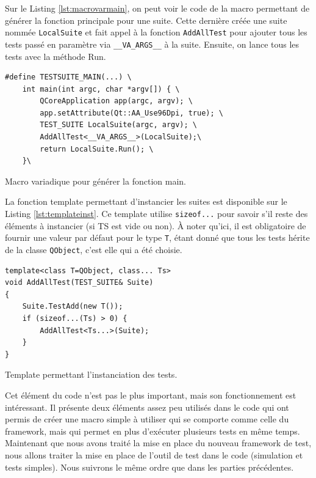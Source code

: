\documentclass[a4paper]{article}
\begin{document}
Sur le Listing \ref{lst:macrovarmain}, on peut voir le code de la macro
permettant de générer la fonction principale pour une suite. Cette dernière
créée une suite nommée \verb|LocalSuite| et fait appel à la fonction
\verb|AddAllTest| pour ajouter tous les tests passé en paramètre via
\verb|__VA_ARGS__| à la suite. Ensuite, on lance tous les tests avec la méthode
Run.

\pagebreak
\begin{listing}[ht!]
\begin{verbatim}
#define TESTSUITE_MAIN(...) \
    int main(int argc, char *argv[]) { \
        QCoreApplication app(argc, argv); \
        app.setAttribute(Qt::AA_Use96Dpi, true); \
        TEST_SUITE LocalSuite(argc, argv); \
        AddAllTest<__VA_ARGS__>(LocalSuite);\
        return LocalSuite.Run(); \
    }\
\end{verbatim}
\caption{Macro variadique pour générer la fonction main.}
\label{lst:macrovarmain}
\end{listing}

La fonction template permettant d'instancier les suites est disponible sur le
Listing \ref{lst:templateinst}. Ce template utilise \verb|sizeof...| pour savoir
s'il reste des éléments à instancier (si TS est vide ou non). À noter qu'ici, il
est obligatoire de fournir une valeur par défaut pour le type \verb|T|, étant
donné que tous les tests hérite de la classe \verb|QObject|, c'est elle qui a
été choisie.

\begin{listing}[ht!]
\begin{verbatim}
template<class T=QObject, class... Ts>
void AddAllTest(TEST_SUITE& Suite)
{
    Suite.TestAdd(new T());
    if (sizeof...(Ts) > 0) {
        AddAllTest<Ts...>(Suite);
    }
}
\end{verbatim}
\caption{Template permettant l'instanciation des tests.}
\label{lst:templateinst}
\end{listing}

Cet élément du code n'est pas le plus important, mais son fonctionnement est
intéressant. Il présente deux éléments assez peu utilisés dans le code qui ont
permis de créer une macro simple à utiliser qui se comporte comme celle du
framework, mais qui permet en plus d'exécuter plusieurs tests en même temps. \\

Maintenant que nous avons traité la mise en place du nouveau framework de test,
nous allons traiter la mise en place de l'outil de test dans le code (simulation
et tests simples). Nous suivrons le même ordre que dans les parties précédentes.
\end{document}
